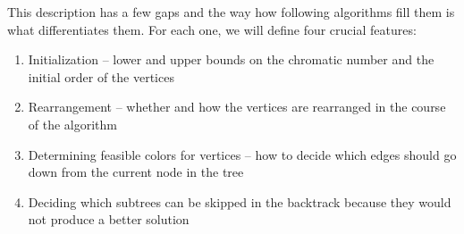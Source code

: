 This description has a few gaps and the way how following algorithms fill them is what differentiates them.
For each one, we will define four crucial features:
\begin{enumerate}
    \item Initialization -- lower and upper bounds on the chromatic number and the initial order of the vertices 
    \item Rearrangement -- whether and how the vertices are rearranged in the course of the algorithm
    \item Determining feasible colors for vertices -- how to decide which edges should go down from the current node in the tree
    \item Deciding which subtrees can be skipped in the backtrack because they would not produce a better solution
\end{enumerate}


